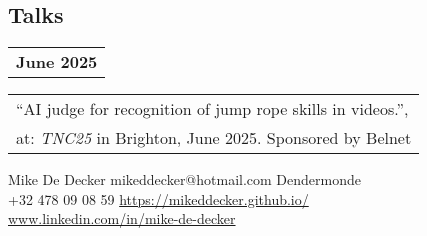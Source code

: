 \documentclass[grey]{hipstercv}
\newlength{\rightcolwidth}
\begin{document}
\begin{paracol}{2}
\begin{minipage}[t]{0.29\rightcolwidth}
\section*{Talks}
\begin{tabular}{@{}>{\footnotesize\bfseries}r @{}}
June 2025 \\[0.5ex]
\end{tabular}
\begin{tabular}{@{}p{0.29\rightcolwidth}@{}}
``AI judge for recognition of jump rope skills in videos.'', \\
at: \emph{TNC25} in Brighton, June 2025. Sponsored by Belnet \\
\end{tabular}
\end{minipage}\hfill


\begin{minipage}[t]{0.48\rightcolwidth}
\end{minipage}







\vfill{} %

\setlength{\parindent}{0pt}
\begin{minipage}[t]{\rightcolwidth}
\begin{center}\fontfamily{\sfdefault}\selectfont \color{black!70}
{
    \small Mike De Decker  mikeddecker@hotmail.com 
    Dendermonde \\  +32 478 09 08 59
     \protect\url{https://mikeddecker.github.io/}\\
     \protect\url{www.linkedin.com/in/mike-de-decker}
}
\end{center}
\end{minipage}


\end{paracol}
\end{document}
